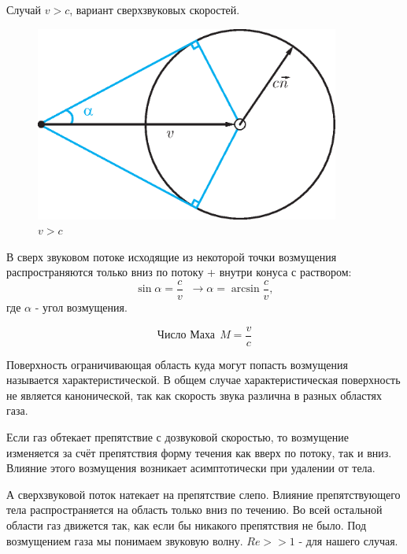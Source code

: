 \documentclass[14pt,a4paper,oneside]{extarticle}	%
\begin{document}
Случай $ v>c $, вариант сверхзвуковых скоростей.
\begin{figure}[h!] 	%
	\centering 		%
	\includegraphics[width=10cm]{16.eps} %
	\caption{  $ v>c $ }
	\label{fig::17}
\end{figure}
В сверх звуковом потоке исходящие из некоторой точки возмущения распространяются только вниз по потоку + внутри конуса с раствором:
\begin{equation*}
\sin \alpha = \frac{c}{v} \;\;\longrightarrow \alpha = \arcsin \frac{c}{v},
\end{equation*}
где $ \alpha $ - угол возмущения.

\begin{equation*}
\text{Число Маха}\:\: M = \frac{v}{c}
\end{equation*}

Поверхность ограничивающая область куда могут попасть возмущения называется характеристической.
В общем случае характеристическая поверхность не является канонической, так как скорость звука различна в разных областях газа.

Если газ обтекает препятствие с дозвуковой скоростью, то возмущение изменяется за счёт препятствия форму течения как вверх по потоку, так и вниз. Влияние этого возмущения возникает асимптотически при удалении от тела.

А сверхзвуковой поток натекает на препятствие слепо. Влияние препятствующего тела распространяется на область только вниз по течению. Во всей остальной области газ движется так, как если бы никакого препятствия не было. Под возмущением газа мы понимаем звуковую волну. $ Re>>1 $ - для нашего случая.        
\end{document}
